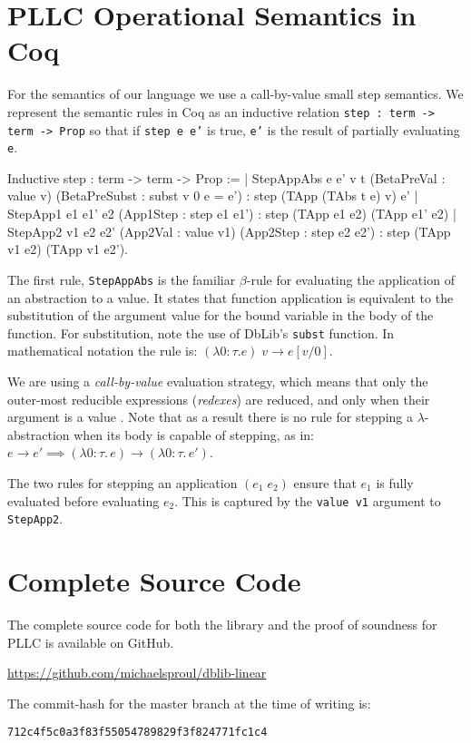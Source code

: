\documentclass[]{unswthesis}
\let\c\texttt
\let\i\textit
\begin{document}
\section{PLLC Operational Semantics in Coq}
\label{app:pllc-op-sems}

For the semantics of our language we use a call-by-value small step semantics. We represent the semantic rules in Coq as an inductive relation \c{step : term -> term -> Prop} so that if \c{step e e'} is true, \c{e'} is the result of partially evaluating \c{e}.

\begin{coqcode}
Inductive step : term -> term -> Prop :=
  | StepAppAbs e e' v t
      (BetaPreVal : value v)
      (BetaPreSubst : subst v 0 e = e') :
      step (TApp (TAbs t e) v) e'
  | StepApp1 e1 e1' e2
      (App1Step : step e1 e1') :
      step (TApp e1 e2) (TApp e1' e2)
  | StepApp2 v1 e2 e2'
      (App2Val : value v1)
      (App2Step : step e2 e2') :
      step (TApp v1 e2) (TApp v1 e2').
\end{coqcode}

The first rule, \c{StepAppAbs} is the familiar $\beta$-rule for evaluating the application of an abstraction to a value. It states that function application is equivalent to the substitution of the argument value for the bound variable in the body of the function. For substitution, note the use of DbLib's \c{subst} function. In mathematical notation the rule is: $(\lambda 0 : \tau. e) \; v \rightarrow e[v/0]$.

We are using a \i{call-by-value} evaluation strategy, which means that only the outer-most reducible expressions (\i{redexes}) are reduced, and only when their argument is a value \cite{tapl}. Note that as a result there is no rule for stepping a $\lambda$-abstraction when its body is capable of stepping, as in: $e \rightarrow e' \implies (\lambda 0 : \tau. \, e) \rightarrow (\lambda 0 : \tau. \, e')$.

The two rules for stepping an application $(e_1 \; e_2)$ ensure that $e_1$ is fully evaluated before evaluating $e_2$. This is captured by the \c{value v1} argument to \c{StepApp2}.

\section{Complete Source Code}
\label{sec:src}

The complete source code for both the library and the proof of soundness for PLLC is available on GitHub.

\url{https://github.com/michaelsproul/dblib-linear}

The commit-hash for the master branch at the time of writing is:

\c{712c4f5c0a3f83f55054789829f3f824771fc1c4}
\end{document}
